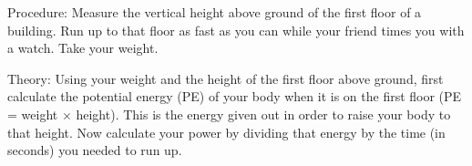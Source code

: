 \begin{multicols}{2}
\begin{description*}
\item[Procedure:]{Measure the vertical height above ground of the first floor of a building. Run up to
that floor as fast as you can while your friend times you with a watch. Take your weight.}
\item[Theory:]{Using your weight and the height of the first floor above ground, first calculate the potential
energy (PE) of your body when it is on the first floor (PE = weight $\times$ height). This is the energy given out in order to raise your body to that height.
Now calculate your power by dividing that energy by the time (in seconds) you needed to
run up.}
\end{description*}


%
%



\end{multicols}
